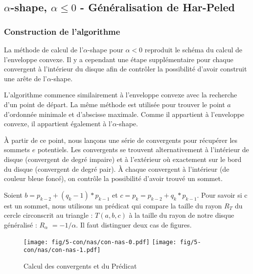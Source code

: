 \subsection{$\alpha$-shape, $\alpha \leq 0$ - Généralisation de Har-Peled}

\subsubsection{Construction de l'algorithme}

La méthode de calcul de l'$\alpha$-shape pour $\alpha <0$ reproduit le schéma du calcul de l’enveloppe convexe. Il y a cependant une étape supplémentaire pour chaque convergent à l'intérieur du disque afin de contrôler la possibilité d'avoir construit une arête de l'$\alpha$-shape.

L'algorithme commence similairement à l'enveloppe convexe avec la recherche d'un point de départ. La même méthode est utilisée pour trouver le point $a$ d'ordonnée minimale et d'abscisse maximale. Comme il appartient à l'enveloppe convexe, il appartient également à l'$\alpha$-shape.

À partir de ce point, nous lançons une série de convergents pour récupérer les sommets $e$ potentiels. Les convergents se trouvent alternativement à l'intérieur de disque (convergent de degré impaire) et à l'extérieur où exactement sur le bord du disque (convergent de degré pair). À chaque convergent à l'intérieur (de couleur bleue foncé), on contrôle la possibilité d'avoir trouvé un sommet.

Soient  $b = p_{k-2} + (q_k - 1) * p_{k-1}$ et $c = p_k = p_{k-2} + q_k * p_{k-1}$. Pour savoir si c est un sommet, nous utilisons un prédicat qui compare la taille du rayon \textbf{$R_T$} du cercle circonscrit au triangle : $T(a, b, c)$ à la taille du rayon de notre disque généralisé : \textbf{$R_{\alpha}$} $= -1/\alpha$. Il faut distinguer deux cas de figures.\\

\begin{figure}[H]
  \centering
  \texttt{[image: fig/5-con/nas/con-nas-0.pdf]}
  \texttt{[image: fig/5-con/nas/con-nas-1.pdf]}
  \caption{Calcul des convergents et du Prédicat}
\end{figure}

